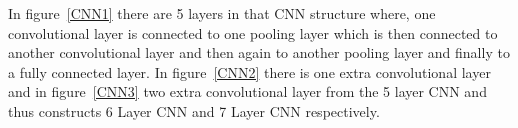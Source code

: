 In figure~\ref{CNN1} there are 5 layers in that CNN structure where, one convolutional layer is connected to one pooling layer which is then connected to another convolutional layer and then again to another pooling layer and finally to a fully connected layer. In figure~\ref{CNN2} there is one extra convolutional layer and in figure~\ref{CNN3} two extra convolutional layer from the 5 layer CNN and thus constructs 6 Layer CNN and 7 Layer CNN respectively. 














%

%
%
%
%
%
%
%
%
%
%
%
